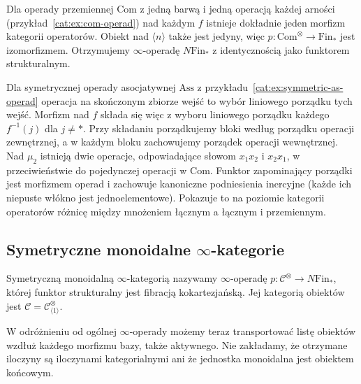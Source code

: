 \begin{przyklad}\label{cat:ex:infty-operad-com-ass}
Dla operady przemiennej $\mathrm{Com}$ z jedną barwą i jedną operacją każdej arności (przykład~\ref{cat:ex:com-operad}) nad każdym $f$ istnieje dokładnie jeden morfizm kategorii operatorów. Obiekt nad $\langle n\rangle$ także jest jedyny, więc $p:\mathrm{Com}^\otimes\to\mathrm{Fin}_*$ jest izomorfizmem. Otrzymujemy $\infty$-operadę $N\mathrm{Fin}_*$ z identycznością jako funktorem strukturalnym.

Dla symetrycznej operady asocjatywnej $\mathrm{Ass}$ z przykładu~\ref{cat:ex:symmetric-as-operad} operacja na skończonym zbiorze wejść to wybór liniowego porządku tych wejść. Morfizm nad $f$ składa się więc z wyboru liniowego porządku każdego $f^{-1}(j)$ dla $j\neq *$. Przy składaniu porządkujemy bloki według porządku operacji zewnętrznej, a w każdym bloku zachowujemy porządek operacji wewnętrznej. Nad $\mu_2$ istnieją dwie operacje, odpowiadające słowom $x_1x_2$ i $x_2x_1$, w przeciwieństwie do pojedynczej operacji w $\mathrm{Com}$. Funktor zapominający porządki jest morfizmem operad i zachowuje kanoniczne podniesienia inercyjne (każde ich niepuste włókno jest jednoelementowe). Pokazuje to na poziomie kategorii operatorów różnicę między mnożeniem łącznym a łącznym i przemiennym.
\end{przyklad}

\subsection{Symetryczne monoidalne \texorpdfstring{$\infty$-kategorie}{kategorie wyższe}}

\begin{definicja}\label{cat:def:infty-symmetric-monoidal}
Symetryczną monoidalną $\infty$-kategorią nazywamy $\infty$-operadę $p:\mathcal C^\otimes\to N\mathrm{Fin}_*$, której funktor strukturalny jest fibracją kokartezjańską. Jej kategorią obiektów jest $\mathcal C=\mathcal C^\otimes_{\langle1\rangle}$.
\end{definicja}

W odróżnieniu od ogólnej $\infty$-operady możemy teraz transportować listę obiektów wzdłuż każdego morfizmu bazy, także aktywnego. Nie zakładamy, że otrzymane iloczyny są iloczynami kategorialnymi ani że jednostka monoidalna jest obiektem końcowym.

